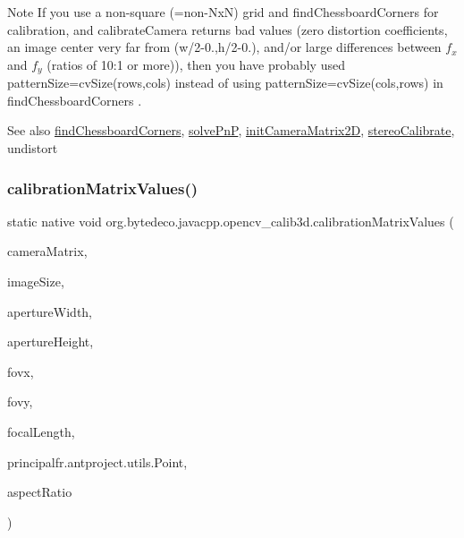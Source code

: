 \begin{DoxyNote}{Note}
If you use a non-\/square (=non-\/\+NxN) grid and find\+Chessboard\+Corners for calibration, and calibrate\+Camera returns bad values (zero distortion coefficients, an image center very far from (w/2-\/0.,h/2-\/0.), and/or large differences between $f_x$ and $f_y$ (ratios of 10\+:1 or more)), then you have probably used pattern\+Size=cv\+Size(rows,cols) instead of using pattern\+Size=cv\+Size(cols,rows) in find\+Chessboard\+Corners . 
\end{DoxyNote}
\begin{DoxySeeAlso}{See also}
\hyperlink{group__calib3d_ga8736b25349ec9178b46c38128bd9d95a}{find\+Chessboard\+Corners}, \hyperlink{group__calib3d_ga4ed4dcff68153a9ec5eb087c0ee29913}{solve\+PnP}, \hyperlink{group__calib3d_ga783c80e734c8368c9db31e3ad820f7fa}{init\+Camera\+Matrix2D}, \hyperlink{group__calib3d_gab585e0688b9d7592dfe294c5179bdcae}{stereo\+Calibrate}, undistort 
\end{DoxySeeAlso}
\mbox{\label{group__calib3d_ga35bea5b10b8dfd23238f72e9a2e2ac27}} 
\subsubsection{\texorpdfstring{calibration\+Matrix\+Values()}{calibrationMatrixValues()}}
{\footnotesize\ttfamily static native void org.\+bytedeco.\+javacpp.\+opencv\+\_\+calib3d.\+calibration\+Matrix\+Values (\begin{DoxyParamCaption}\item[{@By\+Val Mat}]{camera\+Matrix,  }\item[{@By\+Val Size}]{image\+Size,  }\item[{double}]{aperture\+Width,  }\item[{double}]{aperture\+Height,  }\item[{@By\+Ref Double\+Pointer}]{fovx,  }\item[{@By\+Ref Double\+Pointer}]{fovy,  }\item[{@By\+Ref Double\+Pointer}]{focal\+Length,  }\item[{@By\+Ref Point2d}]{principal\+fr.antproject.utils.Point,  }\item[{@By\+Ref Double\+Pointer}]{aspect\+Ratio }\end{DoxyParamCaption})\hspace{0.3cm}{\ttfamily [static]}}




